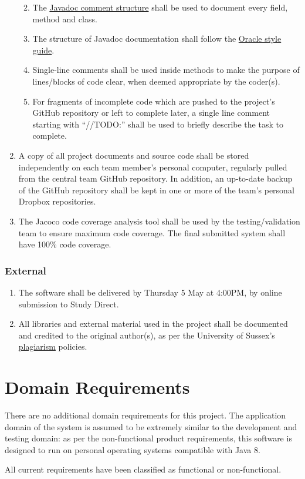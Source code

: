 \documentclass[11pt]{article}
\providecommand{\tightlist}{%
  \setlength{\itemsep}{0pt}\setlength{\parskip}{0pt}}
\begin{document}
\begin{enumerate}
  \begin{enumerate}
  \def\labelenumii{\arabic{enumii}.}
  \tightlist
  \item
    The
    \href{http://www.oracle.com/technetwork/java/javase/documentation/index-jsp-135444.html}{Javadoc
    comment structure} shall be used to document every field, method and
    class.
  \item
    The structure of Javadoc documentation shall follow the
    \href{http://www.oracle.com/technetwork/java/javase/documentation/index-137868.html}{Oracle
    style guide}.
  \item
    Single-line comments shall be used inside methods to make the
    purpose of lines/blocks of code clear, when deemed appropriate by
    the coder(s).
  \item
    For fragments of incomplete code which are pushed to the project's
    GitHub repository or left to complete later, a single line comment
    starting with ``//TODO:'' shall be used to briefly describe the task
    to complete.
  \end{enumerate}
\item
  A copy of all project documents and source code shall be stored
  independently on each team member's personal computer, regularly
  pulled from the central team GitHub repository. In addition, an
  up-to-date backup of the GitHub repository shall be kept in one or
  more of the team's personal Dropbox repositories.
\item
  The Jacoco code coverage analysis tool shall be used by the
  testing/validation team to ensure maximum code coverage. The final
  submitted system shall have 100\% code coverage.
\end{enumerate}

\subsubsection{External}\label{external}

\begin{enumerate}
\def\labelenumi{\arabic{enumi}.}
\tightlist
\item
  The software shall be delivered by Thursday 5 May at 4:00PM, by online
  submission to Study Direct.
\item
  All libraries and external material used in the project shall be
  documented and credited to the original author(s), as per the
  University of Sussex's
  \href{http://www.sussex.ac.uk/s3/?id=35}{plagiarism} policies.
\end{enumerate}

\newpage
\section{Domain Requirements}

There are no additional domain requirements for this project. The application domain of the system is assumed to be extremely similar to the development and testing domain: as per the non-functional product requirements, this software is designed to run on personal operating systems compatible with Java 8.

All current requirements have been classified as functional or non-functional.
\end{document}

